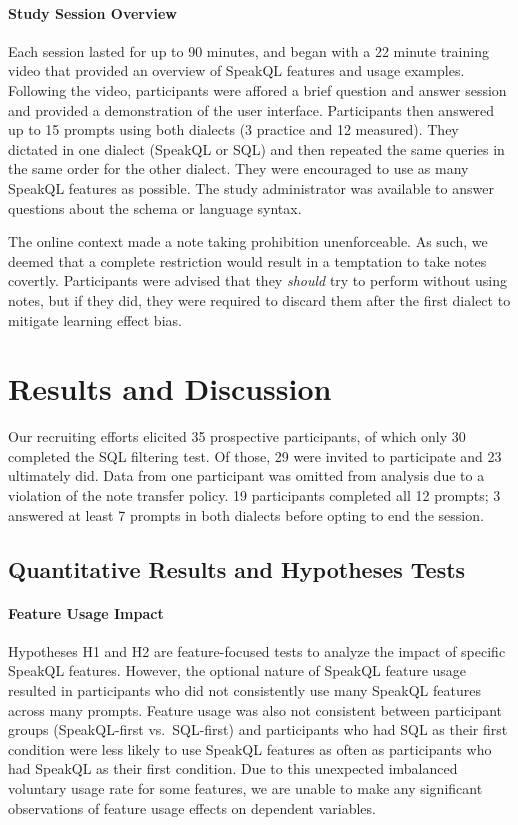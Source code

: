 \paragraph{\textbf{Study Session Overview}}
Each session lasted for up to 90 minutes, and began with a 22 minute training video that provided an overview of SpeakQL features and usage examples. 
Following the video, participants were affored a brief question and answer session and provided a demonstration of the user interface.
Participants then answered up to 15 prompts using both dialects (3 practice and 12 measured). 
They dictated in one dialect (SpeakQL or SQL) and then repeated the same queries in the same order for the other dialect. They were encouraged to use as many SpeakQL features as possible. 
The study administrator was available to answer questions about the schema or language syntax.

The online context made a note taking prohibition unenforceable. 
As such, we deemed that a complete restriction would result in a temptation to take notes covertly. 
Participants were advised that they \emph{should} try to perform without using notes, but if they did, they were required to discard them after the first dialect to mitigate learning effect bias.




\section{Results and Discussion}


Our recruiting efforts elicited 35 prospective participants, of which only 30 completed the SQL filtering test.
Of those, 29 were invited to participate and 23 ultimately did. 
Data from one participant was omitted from analysis due to a violation of the note transfer policy. 
19 participants completed all 12 prompts; 3 answered at least 7 prompts in both dialects before opting to end the session.




\subsection{Quantitative Results and Hypotheses Tests}




\paragraph{\textbf{Feature Usage Impact}} 
Hypotheses H1 and H2 are feature-focused tests to analyze the impact of specific SpeakQL features. 
However, the optional nature of SpeakQL feature usage resulted in participants who did not consistently use many SpeakQL features across many prompts. 
Feature usage was also not consistent between participant groups (SpeakQL-first vs.~SQL-first) and participants who had SQL as their first condition were less likely to use SpeakQL features as often as participants who had SpeakQL as their first condition. 
Due to this unexpected imbalanced voluntary usage rate for some features, we are unable to make any significant observations of feature usage effects on dependent variables. 

